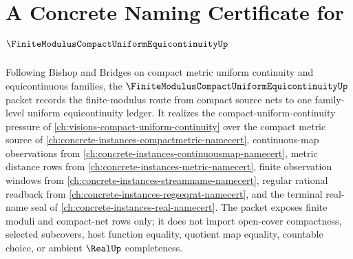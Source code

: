 \chapter{A Concrete Naming Certificate for $\FiniteModulusCompactUniformEquicontinuityUp$}
\label{ch:concrete-instances-finite-modulus-compact-uniform-equicontinuity-namecert}

Following Bishop and Bridges on compact metric uniform continuity and equicontinuous families, the $\FiniteModulusCompactUniformEquicontinuityUp$ packet records the finite-modulus route from compact source nets to one family-level uniform equicontinuity ledger. It realizes the compact-uniform-continuity pressure of \autoref{ch:visions-compact-uniform-continuity} over the compact metric source of \autoref{ch:concrete-instances-compactmetric-namecert}, continuous-map observations from \autoref{ch:concrete-instances-continuousmap-namecert}, metric distance rows from \autoref{ch:concrete-instances-metric-namecert}, finite observation windows from \autoref{ch:concrete-instances-streamname-namecert}, regular rational readback from \autoref{ch:concrete-instances-regseqrat-namecert}, and the terminal real-name seal of \autoref{ch:concrete-instances-real-namecert}. The packet exposes finite moduli and compact-net rows only; it does not import open-cover compactness, selected subcovers, host function equality, quotient map equality, countable choice, or ambient $\RealUp$ completeness.

